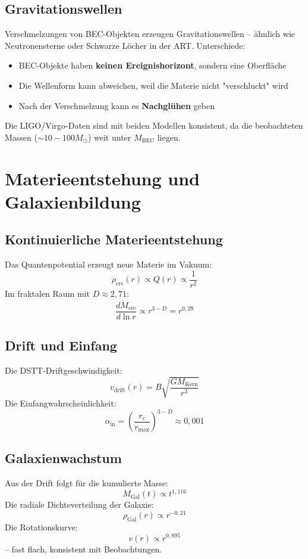 \documentclass[12pt,a4paper]{article}
\begin{document}
\subsection{Gravitationswellen}

Verschmelzungen von BEC-Objekten erzeugen Gravitationswellen – ähnlich wie Neutronensterne oder Schwarze Löcher in der ART. Unterschiede:
\begin{itemize}
\item BEC-Objekte haben \textbf{keinen Ereignishorizont}, sondern eine Oberfläche
\item Die Wellenform kann abweichen, weil die Materie nicht "verschluckt" wird
\item Nach der Verschmelzung kann es \textbf{Nachglühen} geben
\end{itemize}

Die LIGO/Virgo-Daten sind mit beiden Modellen konsistent, da die beobachteten Massen ($\sim 10-100 M_\odot$) weit unter $M_{\text{BEC}}$ liegen.

\section{Materieentstehung und Galaxienbildung}

\subsection{Kontinuierliche Materieentstehung}

Das Quantenpotential erzeugt neue Materie im Vakuum:
\[
\dot{\rho}_{\text{cre}}(r) \propto Q(r) \propto \frac{1}{r^2}
\]
Im fraktalen Raum mit $D \approx 2{,}71$:
\[
\frac{d\dot{M}_{\text{cre}}}{d\ln r} \propto r^{3-D} = r^{0{,}29}
\]

\subsection{Drift und Einfang}

Die DSTT-Driftgeschwindigkeit:
\[
v_{\text{drift}}(r) = B \sqrt{\frac{GM_{\text{Kern}}}{r^3}}
\]
Die Einfangwahrscheinlichkeit:
\[
\alpha_{\text{in}} = \left( \frac{r_c}{r_{\text{max}}} \right)^{3-D} \approx 0{,}001
\]

\subsection{Galaxienwachstum}

Aus der Drift folgt für die kumulierte Masse:
\[
M_{\text{Gal}}(t) \propto t^{1,116}
\]
Die radiale Dichteverteilung der Galaxie:
\[
\rho_{\text{Gal}}(r) \propto r^{-0,21}
\]
Die Rotationskurve:
\[
v(r) \propto r^{0,895}
\]
– fast flach, konsistent mit Beobachtungen.
\end{document}
